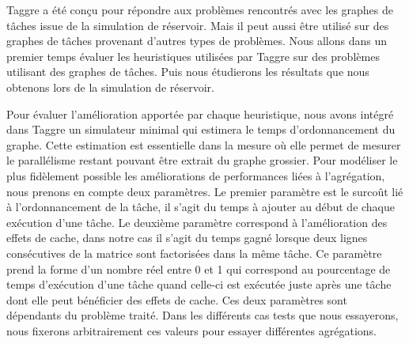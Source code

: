 Taggre a été conçu pour répondre aux problèmes rencontrés avec les graphes de tâches issue de la simulation de réservoir.
%
Mais il peut aussi être utilisé sur des graphes de tâches provenant d'autres types de problèmes.
%
Nous allons dans un premier temps évaluer les heuristiques utilisées par Taggre sur des problèmes utilisant des graphes de tâches.
%
Puis nous étudierons les résultats que nous obtenons lors de la simulation de réservoir.


Pour évaluer l'amélioration apportée par chaque heuristique, nous avons intégré dans Taggre un simulateur minimal qui estimera le temps d'ordonnancement du graphe.
%
Cette estimation est essentielle dans la mesure où elle permet de mesurer le parallélisme restant pouvant être extrait du graphe grossier.
%
Pour modéliser le plus fidèlement possible les améliorations de performances liées à l'agrégation, nous prenons en compte deux paramètres.
%
Le premier paramètre est le surcoût lié à l'ordonnancement de la tâche, il s'agit du temps à ajouter au début de chaque exécution d'une tâche.
%
Le deuxième paramètre correspond à l'amélioration des effets de cache, dans notre cas il s'agit du temps gagné lorsque deux lignes consécutives de la matrice sont factorisées dans la même tâche.
%
Ce paramètre prend la forme d'un nombre réel entre 0 et 1 qui correspond au pourcentage de temps d'exécution d'une tâche quand celle-ci est exécutée juste après une tâche dont elle peut bénéficier des effets de cache.
%
Ces deux paramètres sont dépendants du problème traité.
%
Dans les différents cas tests que nous essayerons, nous fixerons arbitrairement ces valeurs pour essayer différentes agrégations.
